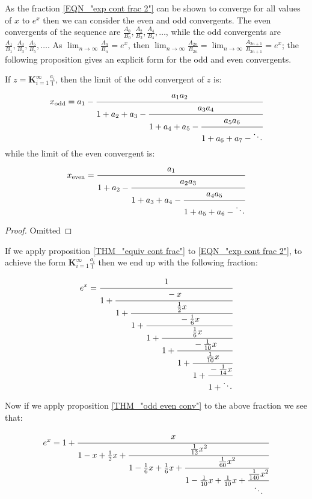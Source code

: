 As the fraction \ref{EQN_"exp cont frac 2"} can be shown to converge for all values of \(x\) to \(e^x\) then we can consider the even and odd convergents. The even convergents of the sequence are \(\frac{A_0}{B_0}, \frac{A_2}{B_2}, \frac{A_4}{B_4}, \ldots\), while the odd convergents are \(\frac{A_1}{B_1}, \frac{A_3}{B_3}, \frac{A_5}{B_5}, \ldots\). As \(\lim_{n\to\infty} \frac{A_n}{B_n}=e^x\), then \(\lim_{n\to\infty}\frac{A_{2n}}{B_{2n}} = \lim_{n\to\infty}\frac{A_{2n+1}}{B_{2n+1}} = e^x\); the following proposition\cite[][86]{BOK_ContFrac} gives an explicit form for the odd and even convergents.

\begin{odd even conv}
\label{THM_"odd even conv"}
If \(z = \mathbf{K}_{i=1}^\infty \frac{a_i}{1}\), then the limit of the odd convergent of \(z\) is:
\begin{displaymath}
	x_{\textrm{odd}}=a_1 - \cfrac{a_1a_2}{1+a_2+a_3 -
						   \cfrac{a_3a_4}{1+a_4+a_5 -
						   \cfrac{a_5a_6}{1+a_6+a_7 - \ddots} } }
\end{displaymath}
while the limit of the even convergent is:
\begin{displaymath}
	x_{\textrm{even}}=\cfrac{a_1}{1+a_2 -
					  \cfrac{a_2a_3}{1+a_3+a_4 -
					  \cfrac{a_4a_5}{1+a_5+a_6 - \ddots} } }
\end{displaymath}
\end{odd even conv}
\begin{proof}
Omitted
\end{proof}

If we apply proposition \ref{THM_"equiv cont frac"} to \ref{EQN_"exp cont frac 2"}, to achieve the form \(\mathbf{K}_{i=1}^\infty \frac{a_i}{1}\) then we end up with the following fraction:

\begin{equation}
	e^x = \cfrac{1}{1 +
		  \cfrac{-x}{1 +
		  \cfrac{\frac{1}{2}x}{1 +
		  \cfrac{-\frac{1}{6}x}{1 +
		  \cfrac{\frac{1}{6}x}{1 +
		  \cfrac{-\frac{1}{10}x}{1 +
		  \cfrac{\frac{1}{10}x}{1 + 
		  \cfrac{-\frac{1}{14}x}{1 + \ddots} } } } } } } }
\end{equation}

Now if we apply proposition \ref{THM_"odd even conv"} to the above fraction we see that:

\begin{equation}
	e^x = 1 + \cfrac{x}{1 - x + \frac{1}{2}x +
			  \cfrac{\frac{1}{12}x^2}{1 - \frac{1}{6}x + \frac{1}{6}x +
			  \cfrac{\frac{1}{60}x^2}{1 -\frac{1}{10}x +\frac{1}{10}x +
			  \cfrac{\frac{1}{140}x^2}{\ddots} } } }
\end{equation}

